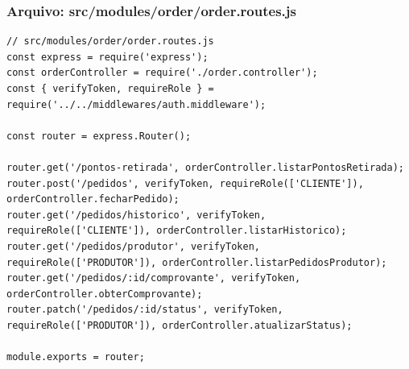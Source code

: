 \subsubsection*{Arquivo: src/modules/order/order.routes.js}
\begin{lstlisting}[caption={src/modules/order/order.routes.js}]
// src/modules/order/order.routes.js
const express = require('express');
const orderController = require('./order.controller');
const { verifyToken, requireRole } = require('../../middlewares/auth.middleware');

const router = express.Router();

router.get('/pontos-retirada', orderController.listarPontosRetirada);
router.post('/pedidos', verifyToken, requireRole(['CLIENTE']), orderController.fecharPedido);
router.get('/pedidos/historico', verifyToken, requireRole(['CLIENTE']), orderController.listarHistorico);
router.get('/pedidos/produtor', verifyToken, requireRole(['PRODUTOR']), orderController.listarPedidosProdutor);
router.get('/pedidos/:id/comprovante', verifyToken, orderController.obterComprovante);
router.patch('/pedidos/:id/status', verifyToken, requireRole(['PRODUTOR']), orderController.atualizarStatus);

module.exports = router;\end{lstlisting}
\vspace{0.5cm}
